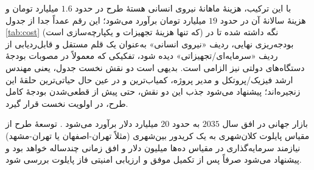 با این ترکیب، هزینهٔ ماهانهٔ نیروی انسانی هستهٔ طرح در حدود $1.6$ میلیارد تومان و هزینهٔ سالانهٔ آن در حدود $19$ میلیارد تومان برآورد می‌شود؛ این رقم عمداً جدا از جدول \ref{tab:cost} (که تنها هزینهٔ تجهیزات و یکپارچه‌سازی است) نگه داشته شده تا در بودجه‌ریزی نهایی، ردیف «نیروی انسانی» به‌عنوان یک قلم مستقل و قابل‌ردیابی از ردیف «سرمایه‌ای/تجهیزاتی» دیده شود، تفکیکی که معمولاً در مصوبات بودجهٔ دستگاه‌های دولتی نیز الزامی است. بدیهی است دو نقش نخست جدول، یعنی مهندس ارشد فیزیک/پروتکل  و مدیر پروژه، کمیاب‌ترین و در عین حال حیاتی‌ترین حلقهٔ این زنجیره‌اند؛ پیشنهاد می‌شود جذب این دو نقش، حتی پیش از قطعی‌شدن بودجهٔ کامل طرح، در اولویت نخست قرار گیرد.



بازار جهانی  در افق سال $2035$ به حدود $20$ میلیارد دلار برآورد می‌شود \Cite{toshiba2020launch}. توسعهٔ طرح از مقیاس پایلوت کلان‌شهری به یک کریدور بین‌شهری (مثلاً تهران-اصفهان یا تهران-مشهد) نیازمند سرمایه‌گذاری در مقیاس ده‌ها میلیون دلار و افق زمانی چندساله خواهد بود و پیشنهاد می‌شود صرفاً پس از تکمیل موفق و ارزیابی امنیتی فاز پایلوت بررسی شود.

